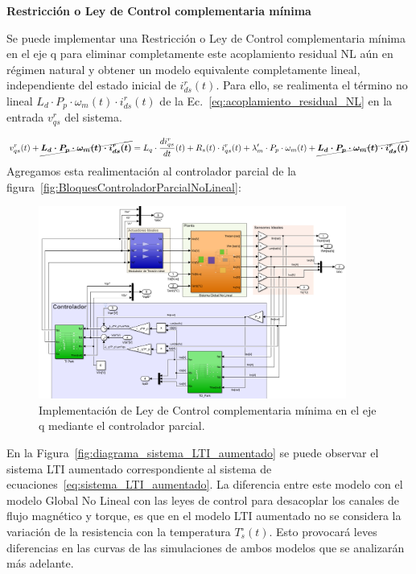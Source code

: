 \documentclass{article}
\begin{document}
\noindent\textbf{Restricción o Ley de Control complementaria mínima}

Se puede implementar una Restricción o Ley de Control complementaria mínima en el eje q para eliminar completamente este acoplamiento residual NL aún en régimen natural
y obtener un modelo equivalente completamente lineal, independiente del estado inicial de
\(i^r_{ds}(t)\). Para ello, se realimenta el término no lineal \(L_d\cdot P_p\cdot\omega_m(t)\cdot i^r_{ds}(t)\) de la Ec.~\ref{eq:acoplamiento_residual_NL} en la entrada \(v^r_{qs}\) del sistema. 

\begin{equation}
v^r_{qs}(t) + \cancel{\boldsymbol{L_d\cdot P_p\cdot\omega_m(t)\cdot i^r_{ds}(t)}} = L_q\cdot \frac{di^r_{qs}}{dt}(t) + R_s(t)\cdot i^r_{qs}(t) + \lambda'_m\cdot P_p\cdot\omega_m(t) + \cancel{\boldsymbol{L_d\cdot P_p\cdot\omega_m(t)\cdot i^r_{ds}(t)}}
\end{equation}
Agregamos esta realimentación al controlador parcial de la figura~\ref{fig:BloquesControladorParcialNoLineal}:

\begin{figure}[H]
    \centering
    \includegraphics[width=0.9\textwidth]{Imagenes/BloquesLinealizacionRealimentacionNoLinealDesacoplo.png}
    \caption{Implementación de Ley de Control complementaria mínima en el eje q mediante el controlador parcial.}
    \label{fig:BloquesControladorParcialNoLinealDesacoplo}
\end{figure}

En la Figura~\ref{fig:diagrama_sistema_LTI_aumentado} se puede observar el sistema LTI aumentado correspondiente al sistema de ecuaciones~\eqref{eq:sistema_LTI_aumentado}. La diferencia entre este modelo con el modelo Global No Lineal con las leyes de control para desacoplar los canales de flujo magnético y torque, es que en el modelo LTI aumentado no se considera la variación de la resistencia con la temperatura \(T^\circ_s(t)\). Esto provocará leves diferencias en las curvas de las simulaciones de ambos modelos que se analizarán más adelante.
\end{document}
